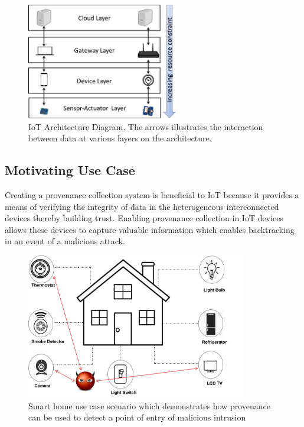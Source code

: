 \documentclass[conference]{IEEEtran}
\begin{document}
%
%
%


\begin{figure}[tb]
\begin{center}

\includegraphics[height=2.0in]{iot_architecture.png}
\end{center}
\caption{IoT Architecture Diagram. The arrows illustrates the interaction between data at various layers on the architecture.}
\label{iot_architecture}

\end{figure}

\subsection{Motivating Use Case}

Creating a provenance collection system is beneficial to IoT because it
provides a means of verifying the integrity of data in the heterogeneous interconnected devices thereby building trust. Enabling provenance collection in IoT devices allows these devices to capture valuable information which enables backtracking in an event of a malicious attack. 


\begin{figure}[h!]
\begin{center}
\includegraphics[height=2.5in]{smart_home.png}
\end{center}
\caption{Smart home use case scenario which demonstrates how provenance can be used to detect a point of entry of malicious intrusion}
\label{smart_home}
\end{figure}
\end{document}
